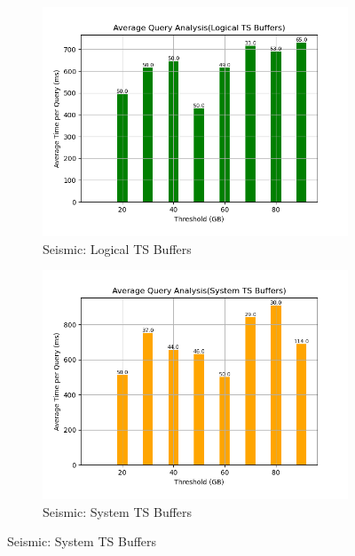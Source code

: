\begin{figure}
	\centering
	\begin{subfigure}[c]{0.48\textwidth}
		\includegraphics[width=1\textwidth]   {figures/Experiments/Dynamic/SEISMIC/batch_answering/25/average_query_time_per_batch_version_999777015_10485760_10_delay[25].png}
		\caption{Seismic: Logical TS Buffers}
		\label{fig:logical-ts-25-seismic}
	\end{subfigure}
	\begin{subfigure}[c]{0.48\textwidth}
		\includegraphics[width=1\textwidth]	 {figures/Experiments/Dynamic/SEISMIC/batch_answering/25/average_query_time_per_batch_version_999777018_10485760_10_delay[25].png}
		\caption{Seismic: System TS Buffers}
		\label{fig:system-ts-25-seismic}

\end{subfigure}
\end{figure}
